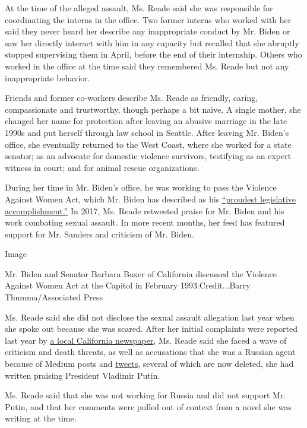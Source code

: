 At the time of the alleged assault, Ms. Reade said she was responsible
for coordinating the interns in the office. Two former interns who
worked with her said they never heard her describe any inappropriate
conduct by Mr. Biden or saw her directly interact with him in any
capacity but recalled that she abruptly stopped supervising them in
April, before the end of their internship. Others who worked in the
office at the time said they remembered Ms. Reade but not any
inappropriate behavior.

Friends and former co-workers describe Ms. Reade as friendly, caring,
compassionate and trustworthy, though perhaps a bit naïve. A single
mother, she changed her name for protection after leaving an abusive
marriage in the late 1990s and put herself through law school in
Seattle. After leaving Mr. Biden's office, she eventually returned to
the West Coast, where she worked for a state senator; as an advocate for
domestic violence survivors, testifying as an expert witness in court;
and for animal rescue organizations.

During her time in Mr. Biden's office, he was working to pass the
Violence Against Women Act, which Mr. Biden has described as his
\href{https://time.com/3319325/joe-biden-violence-against-women/}{``proudest
legislative accomplishment.''} In 2017, Ms. Reade retweeted praise for
Mr. Biden and his work combating sexual assault. In more recent months,
her feed has featured support for Mr. Sanders and criticism of Mr.
Biden.

Image

Mr. Biden and Senator Barbara Boxer of California discussed the Violence
Against Women Act at the Capitol in February 1993.Credit...Barry
Thumma/Associated Press

Ms. Reade said she did not disclose the sexual assault allegation last
year when she spoke out because she was scared. After her initial
complaints were reported last year by
\href{https://www.theunion.com/news/nevada-county-woman-says-joe-biden-inappropriately-touched-her-while-working-in-his-u-s-senate-office/}{a
local California newspaper}, Ms. Reade said she faced a wave of
criticism and death threats, as well as accusations that she was a
Russian agent because of Medium posts and
\href{https://twitter.com/ReadeAlexandra/status/1174846048788873216}{tweets},
several of which are now deleted, she had written praising President
Vladimir Putin.

Ms. Reade said that she was not working for Russia and did not support
Mr. Putin, and that her comments were pulled out of context from a novel
she was writing at the time.

